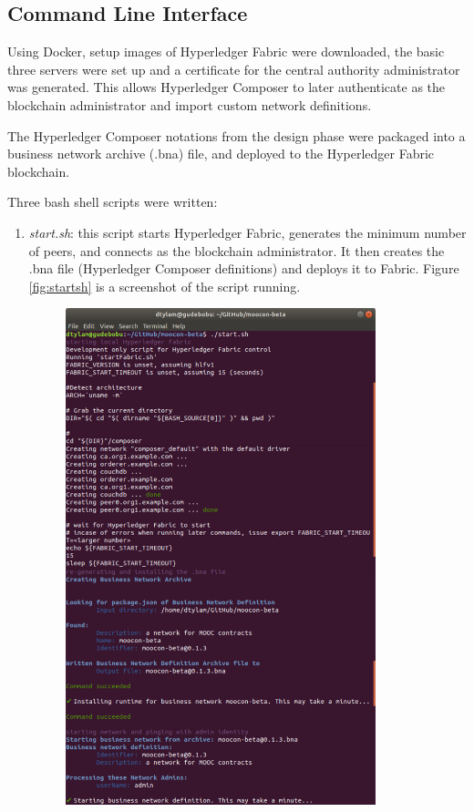 \subsection{Command Line Interface}
Using Docker, setup images of Hyperledger Fabric were downloaded, the basic three servers were set up
and a certificate for the central authority administrator was generated. This allows Hyperledger Composer
to later authenticate as the blockchain administrator and import custom network definitions.

The Hyperledger Composer notations from the design phase were packaged into
a business network archive (.bna) file, and deployed to the Hyperledger Fabric blockchain.

Three bash shell scripts were written:
\begin{enumerate}
	\setlength\itemsep{0em}
	\item \textit{start.sh}: this script starts Hyperledger Fabric, generates the minimum number of peers,
	      and connects as the blockchain administrator. It then creates the .bna file (Hyperledger Composer definitions)
	      and deploys it to Fabric.
	      Figure \ref{fig:startsh} is a screenshot of the script running.
	      \begin{figure}[!ht]
		      \centering
		      \includegraphics[width=0.85\textwidth]{startsh}

\end{figure}
\end{enumerate}
